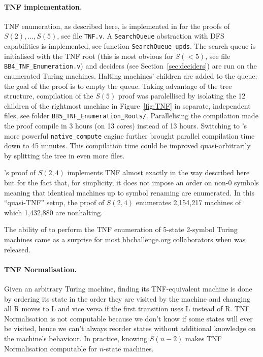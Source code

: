 \paragraph{\CoqBB TNF implementation.} TNF enumeration, as described here, is implemented in \CoqBB for the proofs of $S(2),\dots,S(5)$, see file \texttt{TNF.v}. A \texttt{SearchQueue} abstraction with DFS capabilities is implemented, see function \texttt{SearchQueue\_upds}. The search queue is initialised with the TNF root (this is most obvious for $S(<5)$, \eg see file \texttt{BB4\_TNF\_Enumeration.v}) and deciders (see Section~\ref{sec:deciders}) are run on the enumerated Turing machines. Halting machines' children are added to the queue: the goal of the proof is to empty the queue. Taking advantage of the tree structure, compilation of the $S(5)$ proof was paralellised by isolating the 12 children of the rightmost machine in Figure~\ref{fig:TNF} in separate, independent files, see folder \texttt{BB5\_TNF\_Enumeration\_Roots/}. Parallelising the compilation made the proof compile in 3 hours (on 13 cores) instead of 13 hours. Switching to \Coq's more powerful \texttt{native\_compute} engine \cite{nativecompute} further brought parallel compilation time down to 45 minutes. This compilation time could be improved quasi-arbitrarily by splitting the tree in even more files.

\CoqBB's proof of $S(2,4)$ implements TNF almost exactly in the way described here but for the fact that, for simplicity, it does not impose an order on non-0 symbols meaning that identical machines up to symbol renaming are enumerated. In this ``quasi-TNF'' setup, the proof of $S(2,4)$ enumerates 2,154,217 machines of which 1,432,880 are nonhalting.

The ability of \Coq to perform the TNF enumeration of 5-state 2-symbol Turing machines came as a surprise for most \url{bbchallenge.org} collaborators when \CoqBB was released.




\paragraph{TNF Normalisation.} Given an arbitrary Turing machine, finding its TNF-equivalent machine is done by ordering its state in the order they are visited by the machine and changing all R moves to L and vice versa if the first transition uses L instead of R.  TNF Normalisation is not computable because we don't know if some states will ever be visited, hence we can't always reorder states without additional knowledge on the machine's behaviour. In practice, knowing $S(n-2)$ makes TNF Normalisation computable for $n$-state machines.